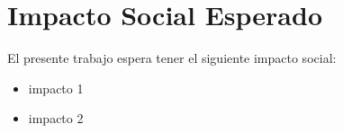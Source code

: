 \chapter{Impacto Social Esperado}
\label{chp:impacto-social}
El presente trabajo espera tener el siguiente impacto social:
\begin{itemize}
\item impacto 1
\item impacto 2
\end{itemize}
